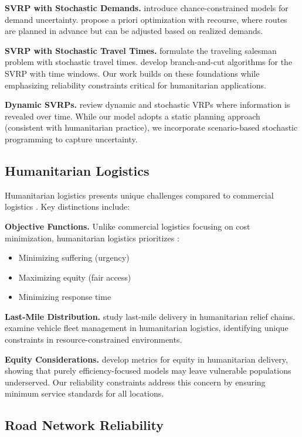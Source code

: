 \textbf{SVRP with Stochastic Demands.} \cite{Dror1995} introduce chance-constrained models for demand uncertainty. \cite{Bertsimas1992} propose a priori optimization with recourse, where routes are planned in advance but can be adjusted based on realized demands.

\textbf{SVRP with Stochastic Travel Times.} \cite{Laporte1992} formulate the traveling salesman problem with stochastic travel times. \cite{Kenyon2003} develop branch-and-cut algorithms for the SVRP with time windows. Our work builds on these foundations while emphasizing reliability constraints critical for humanitarian applications.

\textbf{Dynamic SVRPs.} \cite{Pillac2013} review dynamic and stochastic VRPs where information is revealed over time. While our model adopts a static planning approach (consistent with humanitarian practice), we incorporate scenario-based stochastic programming to capture uncertainty.

\subsection{Humanitarian Logistics}

Humanitarian logistics presents unique challenges compared to commercial logistics \cite{VanWassenhove2016}. Key distinctions include:

\textbf{Objective Functions.} Unlike commercial logistics focusing on cost minimization, humanitarian logistics prioritizes \cite{Kovacs2012}:
\begin{itemize}
\item Minimizing suffering (urgency)
\item Maximizing equity (fair access)
\item Minimizing response time
\end{itemize}

\textbf{Last-Mile Distribution.} \cite{Balcik2008} study last-mile delivery in humanitarian relief chains. \cite{Pedraza-Martinez2014} examine vehicle fleet management in humanitarian logistics, identifying unique constraints in resource-constrained environments.

\textbf{Equity Considerations.} \cite{Gralla2014} develop metrics for equity in humanitarian delivery, showing that purely efficiency-focused models may leave vulnerable populations underserved. Our reliability constraints address this concern by ensuring minimum service standards for all locations.

\subsection{Road Network Reliability}

